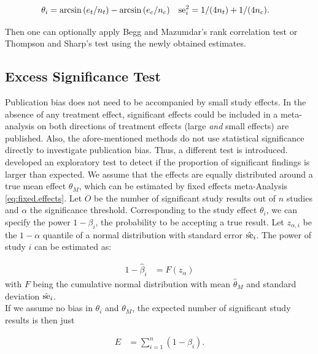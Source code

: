 \documentclass[11pt,a4paper,twoside]{book}\usepackage[]{graphicx}\usepackage[]{color}
\begin{document}
\begin{align}
\theta_i &= \arcsin{(e_t/n_t)} - \arcsin{(e_c/n_c)} \nonumber &
\operatorname{se}_i^2 &= 1/(4n_t) + 1/(4n_c). \nonumber
\end{align}

Then one can optionally apply Begg and Mazumdar's rank correlation test or Thompson and Sharp's test using the newly obtained estimates.


\subsection{Excess Significance Test} \label{sec:excess.significance}
Publication bias does not need to be accompanied by small study effects. In the absence of any treatment effect, significant effects could be included in a meta-analysis on both directions of treatment effects (\ie large \textit{and} small effects) are published. Also, the afore-mentioned methods do not use statistical significance directly to investigate publication bias. Thus, a different test is introduced. \\
\citet{excess.significance} developed an exploratory test to detect if the proportion of significant findings is larger than expected. 
We assume that the effects are equally distributed around a true mean effect $\theta_M$, which can be estimated by fixed effects meta-Analysis \eqref{eq:fixed.effects}. Let $O$ be the number of significant study results out of $n$ studies and $\alpha$ the significance threshold. Corresponding to the study effect $\theta_i$, we can specify the power $1 - \beta_i$, the probability to be accepting a true result. Let $z_{\alpha,i}$ be the $1-\alpha$ quantile of a normal distribution with standard error $\hat{\operatorname{se}}_i$. The power of study $i$ can be estimated as:

\begin{align}
1 - \hat{\beta}_i &= F(z_\alpha) 
\end{align}
with $F$ being the cumulative normal distribution with mean $\hat{\theta}_M$ and standard deviation $\hat{\operatorname{se}}_i$. \\
If we assume no bias in $\theta_i$ and $\theta_M$, the expected number of significant study results is then just

\begin{align}
E &= \sum_{i = 1}^n (1 - \beta_i). \nonumber
\end{align}
\end{document}
